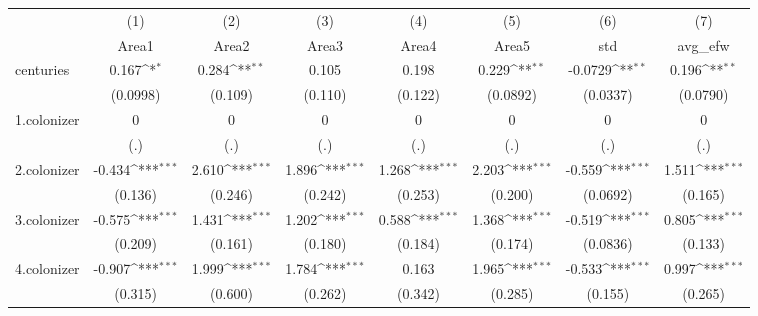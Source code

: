 {
\def\sym#1{\ifmmode^{#1}\else\(^{#1}\)\fi}
\begin{tabular}{l*{7}{c}}
\hline\hline
            &\multicolumn{1}{c}{(1)}&\multicolumn{1}{c}{(2)}&\multicolumn{1}{c}{(3)}&\multicolumn{1}{c}{(4)}&\multicolumn{1}{c}{(5)}&\multicolumn{1}{c}{(6)}&\multicolumn{1}{c}{(7)}\\
            &\multicolumn{1}{c}{Area1}&\multicolumn{1}{c}{Area2}&\multicolumn{1}{c}{Area3}&\multicolumn{1}{c}{Area4}&\multicolumn{1}{c}{Area5}&\multicolumn{1}{c}{std}&\multicolumn{1}{c}{avg\_efw}\\
\hline
centuries   &       0.167\sym{*}  &       0.284\sym{**} &       0.105         &       0.198         &       0.229\sym{**} &     -0.0729\sym{**} &       0.196\sym{**} \\
            &    (0.0998)         &     (0.109)         &     (0.110)         &     (0.122)         &    (0.0892)         &    (0.0337)         &    (0.0790)         \\
[1em]
1.colonizer &           0         &           0         &           0         &           0         &           0         &           0         &           0         \\
            &         (.)         &         (.)         &         (.)         &         (.)         &         (.)         &         (.)         &         (.)         \\
[1em]
2.colonizer &      -0.434\sym{***}&       2.610\sym{***}&       1.896\sym{***}&       1.268\sym{***}&       2.203\sym{***}&      -0.559\sym{***}&       1.511\sym{***}\\
            &     (0.136)         &     (0.246)         &     (0.242)         &     (0.253)         &     (0.200)         &    (0.0692)         &     (0.165)         \\
[1em]
3.colonizer &      -0.575\sym{***}&       1.431\sym{***}&       1.202\sym{***}&       0.588\sym{***}&       1.368\sym{***}&      -0.519\sym{***}&       0.805\sym{***}\\
            &     (0.209)         &     (0.161)         &     (0.180)         &     (0.184)         &     (0.174)         &    (0.0836)         &     (0.133)         \\
[1em]
4.colonizer &      -0.907\sym{***}&       1.999\sym{***}&       1.784\sym{***}&       0.163         &       1.965\sym{***}&      -0.533\sym{***}&       0.997\sym{***}\\
            &     (0.315)         &     (0.600)         &     (0.262)         &     (0.342)         &     (0.285)         &     (0.155)         &     (0.265)         \\

\end{tabular}}
